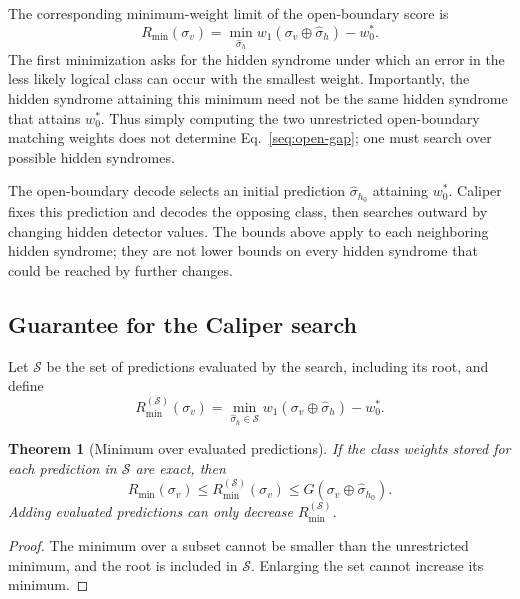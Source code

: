 \documentclass[
    reprint,
    amsmath,amssymb,
    nofootinbib,
    superscriptaddress,
    aps,
    noeprint,
    longbibliography,
    prl
]{revtex4-2}
\theoremstyle{plain}
\newtheorem{theorem}{Theorem}[section]
\begin{document}
The corresponding minimum-weight limit of the open-boundary score is
\begin{equation}
    R_{\min}(\sigma_v)
    =
    \min_{\hat\sigma_h}
    w_1(\sigma_v\oplus\hat\sigma_h)
    -
    w_0^*.
    \label{seq:open-gap}
\end{equation}
The first minimization asks for the hidden syndrome under which an error in the less
likely logical class can occur with the smallest weight. Importantly, the hidden syndrome attaining this
minimum need not be the same hidden syndrome that attains $w_0^*$. Thus simply computing the two
unrestricted open-boundary matching weights does not determine Eq.~\eqref{seq:open-gap}; one must
search over possible hidden syndromes.

The open-boundary decode selects an initial prediction $\hat\sigma_{h_0}$ attaining $w_0^*$.
Caliper fixes this prediction and decodes the opposing class, then searches outward by changing
hidden detector values. The bounds above apply to each neighboring hidden syndrome; they are not lower
bounds on every hidden syndrome that could be reached by further changes.

\subsection{Guarantee for the Caliper search}

Let $\mathcal S$ be the set of predictions evaluated by the search, including its root, and define
\begin{equation}
    R_{\min}^{(\mathcal S)}(\sigma_v)
    = \min_{\hat\sigma_h\in\mathcal S}w_1(\sigma_v\oplus\hat\sigma_h)-w_0^*.
    \label{seq:truncated-gap}
\end{equation}

\begin{theorem}[Minimum over evaluated predictions]
    \label{sthm:main}
    If the class weights stored for each prediction in $\mathcal S$ are exact, then
    \begin{equation}
        R_{\min}(\sigma_v)\leq R_{\min}^{(\mathcal S)}(\sigma_v)
        \leq G(\sigma_v\oplus\hat\sigma_{h_0}).
        \label{seq:one-sided-depth}
    \end{equation}
    Adding evaluated predictions can only decrease $R_{\min}^{(\mathcal S)}$.
\end{theorem}
\begin{proof}
    The minimum over a subset cannot be smaller than the unrestricted minimum, and the root is
    included in $\mathcal S$. Enlarging the set cannot increase its minimum.
\end{proof}
\end{document}
